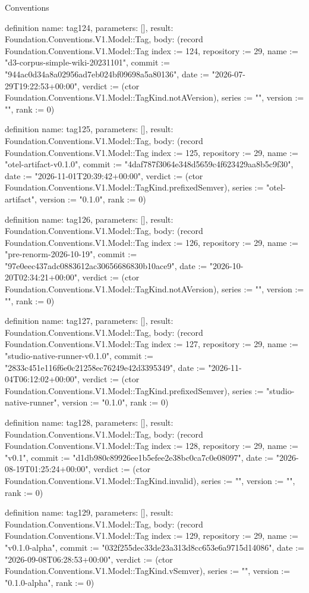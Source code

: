 \begin{lexlean}{Conventions}
\begin{semanticmodule}
definition{
  name: tag124,
  parameters: [],
  result: Foundation.Conventions.V1.Model::Tag,
  body: (record Foundation.Conventions.V1.Model::Tag {index := 124, repository := 29, name := "d3-corpus-simple-wiki-20231101", commit := "944ac0d34a8a02956ad7eb024bf09698a5a80136", date := "2026-07-29T19:22:53+00:00", verdict := (ctor Foundation.Conventions.V1.Model::TagKind.notAVersion), series := "", version := "", rank := 0})
}

definition{
  name: tag125,
  parameters: [],
  result: Foundation.Conventions.V1.Model::Tag,
  body: (record Foundation.Conventions.V1.Model::Tag {index := 125, repository := 29, name := "otel-artifact-v0.1.0", commit := "4daf787f3064e348d5659c4f623429aa8b5c9f30", date := "2026-11-01T20:39:42+00:00", verdict := (ctor Foundation.Conventions.V1.Model::TagKind.prefixedSemver), series := "otel-artifact", version := "0.1.0", rank := 0})
}

definition{
  name: tag126,
  parameters: [],
  result: Foundation.Conventions.V1.Model::Tag,
  body: (record Foundation.Conventions.V1.Model::Tag {index := 126, repository := 29, name := "pre-renorm-2026-10-19", commit := "97e0eec437adc0883612ac30656686830b10ace9", date := "2026-10-20T02:34:21+00:00", verdict := (ctor Foundation.Conventions.V1.Model::TagKind.notAVersion), series := "", version := "", rank := 0})
}

definition{
  name: tag127,
  parameters: [],
  result: Foundation.Conventions.V1.Model::Tag,
  body: (record Foundation.Conventions.V1.Model::Tag {index := 127, repository := 29, name := "studio-native-runner-v0.1.0", commit := "2833c451e116f6e0c21258ec76249e42d3395349", date := "2026-11-04T06:12:02+00:00", verdict := (ctor Foundation.Conventions.V1.Model::TagKind.prefixedSemver), series := "studio-native-runner", version := "0.1.0", rank := 0})
}

definition{
  name: tag128,
  parameters: [],
  result: Foundation.Conventions.V1.Model::Tag,
  body: (record Foundation.Conventions.V1.Model::Tag {index := 128, repository := 29, name := "v0.1", commit := "d1db980c89926ee1b5efee2e38bc0ca7c0e08097", date := "2026-08-19T01:25:24+00:00", verdict := (ctor Foundation.Conventions.V1.Model::TagKind.invalid), series := "", version := "", rank := 0})
}

definition{
  name: tag129,
  parameters: [],
  result: Foundation.Conventions.V1.Model::Tag,
  body: (record Foundation.Conventions.V1.Model::Tag {index := 129, repository := 29, name := "v0.1.0-alpha", commit := "032f255dec33de23a313d8cc653e6a9715d14086", date := "2026-09-08T06:28:53+00:00", verdict := (ctor Foundation.Conventions.V1.Model::TagKind.vSemver), series := "", version := "0.1.0-alpha", rank := 0})
}


\end{semanticmodule}
\end{lexlean}
